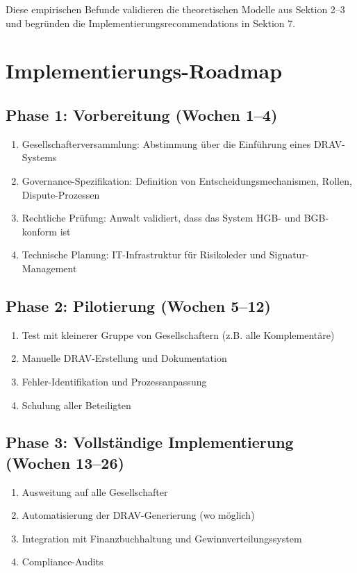 \documentclass[a4paper, 12pt, twoside, openright]{report}
\theoremstyle{definition}
\theoremstyle{definition}
\begin{document}
Diese empirischen Befunde validieren die theoretischen Modelle aus Sektion 2--3 und begründen die Implementierungsrecommendations in Sektion 7.

\section{Implementierungs-Roadmap}

\subsection{Phase 1: Vorbereitung (Wochen 1--4)}

\begin{enumerate}
    \item Gesellschafterversammlung: Abstimmung über die Einführung eines DRAV-Systems
    \item Governance-Spezifikation: Definition von Entscheidungsmechanismen, Rollen, Dispute-Prozessen
    \item Rechtliche Prüfung: Anwalt validiert, dass das System HGB- und BGB-konform ist
    \item Technische Planung: IT-Infrastruktur für Risikoleder und Signatur-Management
\end{enumerate}

\subsection{Phase 2: Pilotierung (Wochen 5--12)}

\begin{enumerate}
    \item Test mit kleinerer Gruppe von Gesellschaftern (z.B. alle Komplementäre)
    \item Manuelle DRAV-Erstellung und Dokumentation
    \item Fehler-Identifikation und Prozessanpassung
    \item Schulung aller Beteiligten
\end{enumerate}

\subsection{Phase 3: Vollständige Implementierung (Wochen 13--26)}

\begin{enumerate}
    \item Ausweitung auf alle Gesellschafter
    \item Automatisierung der DRAV-Generierung (wo möglich)
    \item Integration mit Finanzbuchhaltung und Gewinnverteilungssystem
    \item Compliance-Audits
\end{enumerate}
\end{document}
